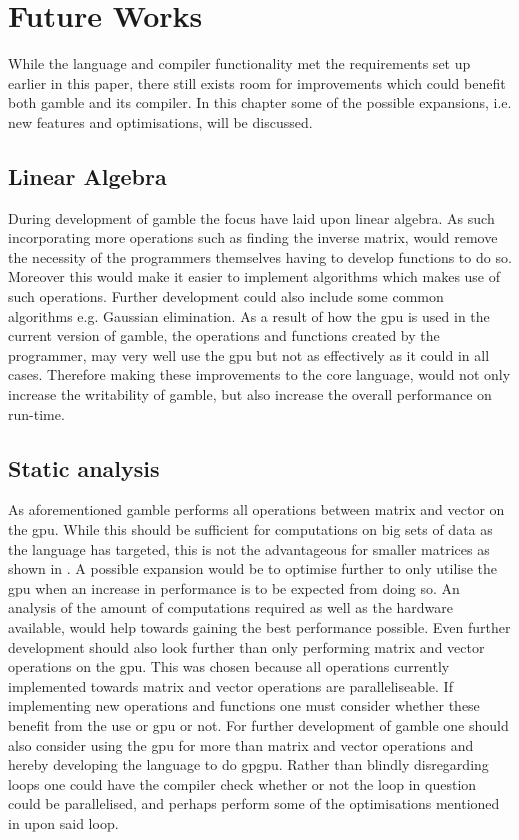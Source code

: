 \chapter{Future Works}\label{cha:future_works}
While the language and compiler functionality met the requirements set up earlier in this paper, there still exists room for improvements which could benefit both \gls{gamble} and its compiler.
In this chapter some of the possible expansions, i.e. new features and optimisations, will be discussed.

\section{Linear Algebra}\label{improve:LIAL}
During development of \gls{gamble} the focus have laid upon linear algebra.
As such incorporating more operations such as finding the inverse matrix, would remove the necessity of the programmers themselves having to develop functions to do so.
Moreover this would make it easier to implement algorithms which makes use of such operations.
Further development could also include some common algorithms e.g. Gaussian elimination.
As a result of how the \acrshort{gpu} is used in the current version of \gls{gamble}, the operations and functions created by the programmer, may very well use the \acrshort{gpu} but not as effectively as it could in all cases.
Therefore making these improvements to the core language, would not only increase the writability of \gls{gamble}, but also increase the overall performance on run-time.

\section{Static analysis}
As aforementioned \gls{gamble} performs all operations between matrix and vector on the \acrshort{gpu}.
While this should be sufficient for computations on big sets of data as the language has targeted, this is not the advantageous for smaller matrices as shown in .
A possible expansion would be to optimise further to only utilise the \acrshort{gpu} when an increase in performance is to be expected from doing so.
An analysis of the amount of computations required as well as the hardware available, would help towards gaining the best performance possible.
Even further development should also look further than only performing matrix and vector operations on the \acrshort{gpu}.
This was chosen because all operations currently implemented towards matrix and vector operations are paralleliseable.
If implementing new operations and functions one must consider whether these benefit from the use or \acrshort{gpu} or not.
For further development of \gls{gamble} one should also consider using the \acrshort{gpu} for more than matrix and vector operations and hereby developing the language to do \gls{gpgpu}. 
Rather than blindly disregarding loops one could have the compiler check whether or not the loop in question could be parallelised, and perhaps perform some of the optimisations mentioned in  upon said loop.
 
